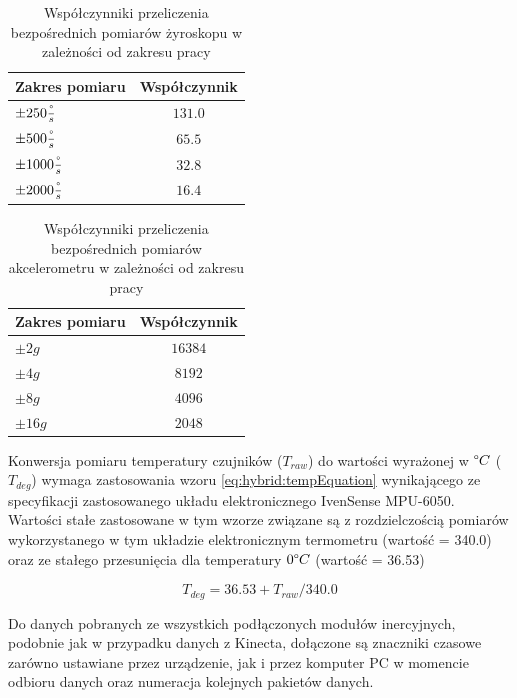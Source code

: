 \begin{table}[!htp]
	\centering
	\caption{Współczynniki przeliczenia bezpośrednich pomiarów żyroskopu w zależności od zakresu pracy}	
	\label{tab:hybrid:gyroRangeFactors}	
	\begin{tabular}{|l|c|}
		\hline
		Zakres pomiaru             & Współczynnik \\ \hline
		$\pm250\frac{\degree}{s}$  & $131.0$        \\ \hline
		\textbf{$\pm500\frac{\degree}{s}$}  & \textbf{$65.5$}         \\ \hline
		$\pm1000\frac{\degree}{s}$ & $32.8$         \\ \hline
		$\pm2000\frac{\degree}{s}$ & $16.4$         \\ \hline
	\end{tabular}
\end{table} 		
\begin{table}[!htp]
	\centering
	\caption{Współczynniki przeliczenia bezpośrednich pomiarów akcelerometru w zależności od zakresu pracy}
	\label{tab:hybrid:accRangeFactors} 
	\begin{tabular}{|l|c|}
		\hline
		Zakres pomiaru & Współczynnik \\ \hline
		$\pm2g$        & $16384$        \\ \hline
		\textbf{$\pm4g$}        & \textbf{$8192$}         \\ \hline
		$\pm8g$        & $4096$         \\ \hline
		$\pm16g$       & $2048$         \\ \hline
	\end{tabular}
\end{table} 

Konwersja pomiaru temperatury czujników ($T_{raw}$) do wartości wyrażonej w $\degree C$ ($T_{deg}$) wymaga zastosowania wzoru \eqref{eq:hybrid:tempEquation} wynikającego ze specyfikacji zastosowanego układu elektronicznego IvenSense MPU-6050. Wartości stałe zastosowane w tym wzorze związane są z rozdzielczością pomiarów wykorzystanego w tym układzie elektronicznym termometru (wartość = 340.0) oraz ze stałego przesunięcia dla temperatury $0 \degree C$ (wartość = 36.53)

\begin{equation}
	T_{deg} = 36.53 + T_{raw} / 340.0
	\label{eq:hybrid:tempEquation}
\end{equation}

Do danych pobranych ze wszystkich podłączonych modułów inercyjnych, podobnie jak w przypadku danych z Kinecta, dołączone są znaczniki czasowe zarówno ustawiane przez urządzenie, jak i przez komputer PC w momencie odbioru danych oraz numeracja kolejnych pakietów danych.


